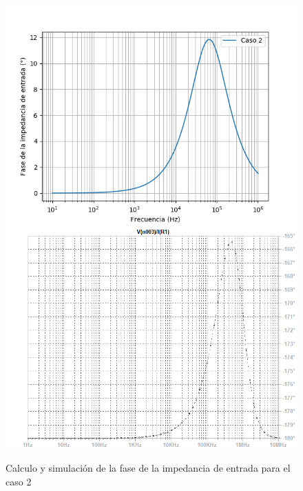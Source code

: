 \begin{figure}[H]
\begin{centering}
\includegraphics[scale=0.5]{../Ex1/iA/Resources1a/zinpp2}\includegraphics[scale=0.4]{../Ex1/iA/Resources1a/zinpp2_sim}
\par\end{centering}
\caption{Calculo y simulación de la fase de la impedancia de entrada para el
caso 2}
\end{figure}

